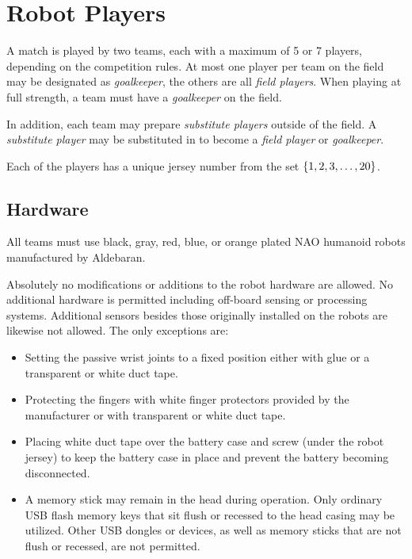 \section{Robot Players}
\label{sec:robot_players}
A match is played by two teams, each with a maximum of 5 or 7 players, depending on the competition rules.
At most one player per team on the field may be designated as \emph{goalkeeper}, the others are all \emph{field players}.
When playing at full strength, a team must have a \emph{goalkeeper} on the field.

In addition, each team may prepare \emph{substitute players} outside of the field. A \emph{substitute player} may be substituted in to become a \emph{field player} or \emph{goalkeeper}.

Each of the players has a unique jersey number from the set $\{1, 2, 3, \ldots, 20\}$.

\subsection{Hardware}
\label{sec:hardware}
All teams must use black, gray, red, blue, or orange plated NAO humanoid robots manufactured by Aldebaran.

Absolutely no modifications or additions to the robot hardware are allowed. No additional hardware is permitted including off-board sensing or processing systems. Additional sensors besides those originally installed on the robots are likewise not allowed. The only exceptions are:

\begin{itemize}
    \item Setting the passive wrist joints to a fixed position either with glue or a transparent or white duct tape.
    \item Protecting the fingers with white finger protectors provided by the manufacturer or with transparent or white duct tape.
    \item Placing white duct tape over the battery case and screw (under the robot jersey) to keep the battery case in place and prevent the battery becoming disconnected.
    \item A memory stick may remain in the head during operation.  Only ordinary USB flash memory keys that sit flush or recessed to the head casing may be utilized. Other USB dongles or devices, as well as memory sticks that are not flush or recessed, are not permitted.
\end{itemize}

